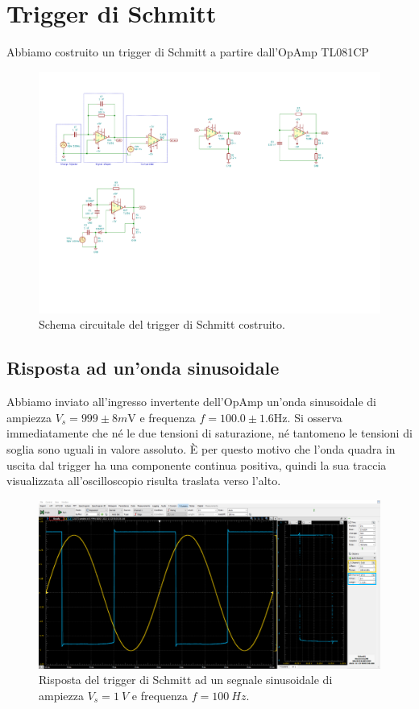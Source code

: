 \documentclass[10pt, a4paper, italian]{article}
\begin{document}
\section{Trigger di Schmitt}
Abbiamo costruito un trigger di Schmitt a partire dall'OpAmp TL081CP
\begin{figure}[htbp]
    \centering
	\includegraphics[scale=1.5]{trgSchmitt}
    \caption{Schema circuitale del trigger di Schmitt costruito.
    \label{fig: trgschmittschm}}
\end{figure}

\subsection{Risposta ad un'onda sinusoidale}
Abbiamo inviato all'ingresso invertente dell'OpAmp un'onda sinusoidale di
ampiezza $V_s = 999 \pm 8 \si{m\V}$ e frequenza $f = 100.0 \pm 1.6 \si{\Hz}$.
Si osserva immediatamente che né le due tensioni di saturazione, né tantomeno
le tensioni di soglia sono uguali in valore assoluto. \`E per questo motivo
che l'onda quadra in uscita dal trigger ha una componente continua positiva,
quindi la sua traccia visualizzata all'oscilloscopio risulta traslata verso
l'alto.
\begin{figure}[htbp]
\centering
\includegraphics[scale=0.335]{schmitt}
\caption{Risposta del trigger di Schmitt ad un segnale sinusoidale di ampiezza
$V_s = \SI{1}{V}$ e frequenza $f = \SI{100}{Hz}$. \label{fig: schmittsine}}
\end{figure}
\end{document}
